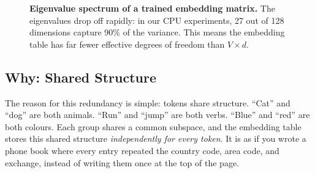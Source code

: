 \documentclass[11pt, a4paper]{article}
\theoremstyle{remark}
\begin{document}
\begin{figure}[h]
\centering
{}
\caption{\textbf{Eigenvalue spectrum of a trained embedding matrix.}
The eigenvalues drop off rapidly: in our CPU experiments, 27 out of 128 dimensions capture 90\% of the variance.
This means the embedding table has far fewer effective degrees of freedom than $V \times d$.}
\label{fig:eigenvalues}
\end{figure}

\subsection{Why: Shared Structure}

The reason for this redundancy is simple: tokens share structure.
``Cat'' and ``dog'' are both animals.
``Run'' and ``jump'' are both verbs.
``Blue'' and ``red'' are both colours.
Each group shares a common subspace, and the embedding table stores this shared structure \emph{independently for every token}.
It is as if you wrote a phone book where every entry repeated the country code, area code, and exchange, instead of writing them once at the top of the page.
\end{document}
